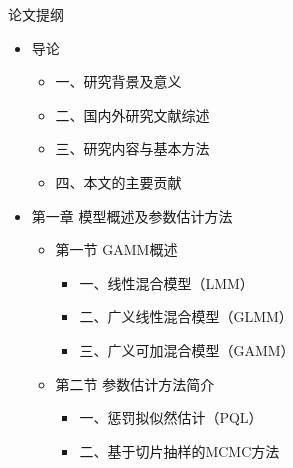 \documentclass[ignorenonframetext,11pt,xcolor=dvipsnames,aspectratio=1610,hyperref={bookmarksdepth=4}]{beamer}
\providecommand{\tightlist}{%
  \setlength{\itemsep}{0pt}\setlength{\parskip}{0pt}}
\begin{document}
\begin{frame}{论文提纲}

\begin{itemize}
\tightlist
\item
  导论

  \begin{itemize}
  \tightlist
  \item
    一、研究背景及意义
  \item
    二、国内外研究文献综述
  \item
    三、研究内容与基本方法
  \item
    四、本文的主要贡献
  \end{itemize}
\item
  第一章 模型概述及参数估计方法

  \begin{itemize}
  \tightlist
  \item
    第一节 GAMM概述

    \begin{itemize}
    \tightlist
    \item
      一、线性混合模型（LMM）
    \item
      二、广义线性混合模型（GLMM）
    \item
      三、广义可加混合模型（GAMM）
    \end{itemize}
  \item
    第二节 参数估计方法简介

    \begin{itemize}
    \tightlist
    \item
      一、惩罚拟似然估计（PQL）
    \item
      二、基于切片抽样的MCMC方法
    \end{itemize}
  \end{itemize}
\end{itemize}

\end{frame}
\end{document}
